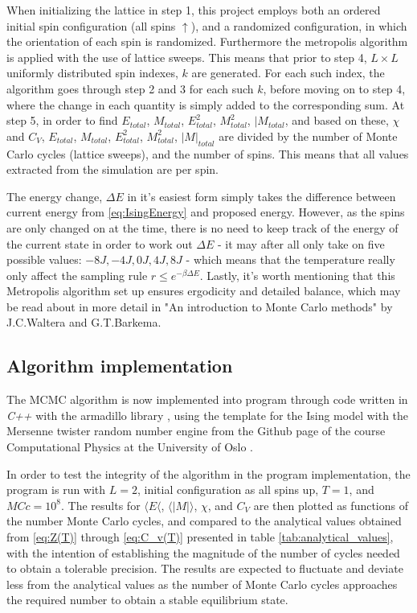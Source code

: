 \documentclass[%
oneside,                 %
final,                   %
10pt]{article}
\begin{document}
When initializing the lattice in step 1, this project employs both an ordered initial spin configuration (all spins $\uparrow$), and a randomized configuration, in which the orientation of each spin is randomized. Furthermore the metropolis algorithm is applied with the use of lattice sweeps. This means that prior to step 4, $L \times L$ uniformly distributed spin indexes, $k$ are generated. For each such index, the algorithm goes through step 2 and 3 for each such $k$, before moving on to step 4, where the change in each quantity is simply added to the corresponding sum. At step 5, in order to find $E_{total}$, $M_{total}$, $E^2_{total}$, $M^2_{total}$, $|M_{total}$, and based on these, $\chi$ and $C_V$, $E_{total}$, $M_{total}$, $E^2_{total}$, $M^2_{total}$, $|M|_{total}$ are divided by the number of Monte Carlo cycles (lattice sweeps), and the number of spins. This means that all values extracted from the simulation are per spin.  \newline


The energy change, $\Delta E$ in it's easiest form simply takes the difference between current energy from \eqref{eq:IsingEnergy} and proposed energy. However, as the spins are only changed on at the time, there is no need to keep track of the energy of the current state in order to work out $\Delta E$ - it may after all only take on five possible values: $-8J, -4J, 0J,4J, 8J$  \cite{HJ-SP} - which means that the temperature really only affect the sampling rule $r\leq e^{-\beta \Delta E}$. Lastly, it's worth mentioning that this Metropolis algorithm set up ensures ergodicity and detailed balance, which may be read about in more detail in 
"An introduction to Monte Carlo methods" by J.C.Waltera and G.T.Barkema\cite{Walter}.


\subsection{Algorithm implementation}
\label{SS:init.algo.impl}	
The MCMC algorithm is now implemented into program through code written in \textit{C++} with the armadillo library \cite{armadillo}, using the template for the Ising model with the Mersenne twister random number engine from the Github page of the course Computational Physics at the University of Oslo \cite{CPgithub}. \newline

In order to test the integrity of the algorithm in the program implementation, the program is run with $L=2$, initial configuration as all spins up, $T=1$, and $MCc=10^8$. The results for $\langle E \langle$, $\langle |M| \rangle$, $\chi$, and $C_V$ are then plotted as functions of the number Monte Carlo cycles, and compared to the analytical values obtained from \eqref{eq:Z(T)} through \eqref{eq:C_v(T)} presented in table \ref{tab:analytical_values}, with the intention of establishing the magnitude of the number of cycles needed to obtain a tolerable precision. The results are expected to fluctuate and deviate less from the analytical values as the number of Monte Carlo cycles approaches the required number to obtain a stable equilibrium state.\newline
\end{document}

